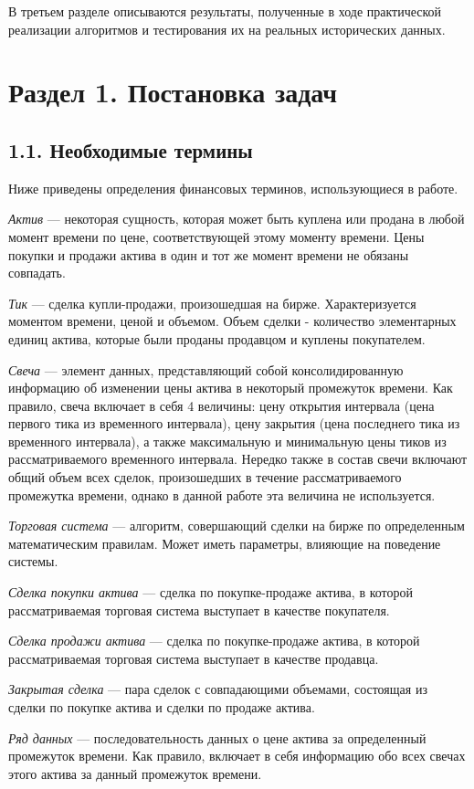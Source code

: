 \documentclass[12pt]{article}
\begin{document}
В третьем разделе описываются результаты, полученные в ходе практической реализации алгоритмов и тестирования их на реальных исторических данных.
\section{Раздел 1. Постановка задач}
\subsection{1.1. Необходимые термины}
Ниже приведены определения финансовых терминов, использующиеся в работе.

{\it Актив} --- некоторая сущность, которая может быть куплена или продана в любой момент времени по цене, соответствующей этому моменту времени. Цены покупки и продажи актива в один и тот же момент времени не обязаны совпадать.

{\it Тик} --- сделка купли-продажи, произошедшая на бирже. Характеризуется моментом времени, ценой и объемом. Объем сделки - количество элементарных единиц актива, которые были проданы продавцом и куплены покупателем.

{\it Свеча} --- элемент данных, представляющий собой консолидированную информацию об изменении цены актива в некоторый промежуток времени. Как правило, свеча включает в себя 4 величины: цену открытия интервала (цена первого тика из временного интервала), цену закрытия (цена последнего тика из временного интервала), а также максимальную и минимальную цены тиков из рассматриваемого временного интервала. Нередко также в состав свечи включают общий объем всех сделок, произошедших в течение рассматриваемого промежутка времени, однако в данной работе эта величина не используется.

{\it Торговая система} --- алгоритм, совершающий сделки на бирже по определенным математическим правилам. Может иметь параметры, влияющие на поведение системы.

{\it Сделка покупки актива} --- сделка по покупке-продаже актива, в которой рассматриваемая торговая система выступает в качестве покупателя.

{\it Сделка продажи актива} --- сделка по покупке-продаже актива, в которой рассматриваемая торговая система выступает в качестве продавца.

{\it Закрытая сделка} --- пара сделок с совпадающими объемами, состоящая из сделки по покупке актива и сделки по продаже актива.

{\it Ряд данных} --- последовательность данных о цене актива за определенный промежуток времени. Как правило, включает в себя информацию обо всех свечах этого актива за данный промежуток времени.
\end{document}
